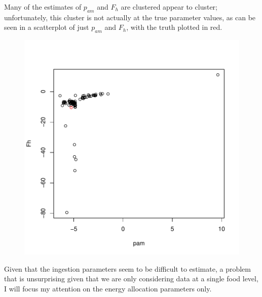 \documentclass[12pt,reqno,final]{amsart}
\theoremstyle{plain}
\numberwithin{equation}{part}
\begin{document}
Many of the estimates of $p_{am}$ and $F_h$ are clustered
appear to cluster; unfortunately, this cluster is not actually at the
true parameter values, as can be seen in a scatterplot of just
$p_{am}$ and $F_h$, with the truth plotted in red.

\begin{figure}
\includegraphics{Solving_the_problem_of_parameter_covariation-003}
\end{figure}

Given that the ingestion parameters seem to be difficult to estimate,
a problem that is unsurprising given that we are only considering data
at a single food level, I will focus my attention on the energy
allocation parameters only.
\end{document}
